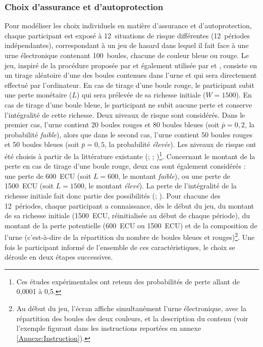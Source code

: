 \begin{Article}
\begin{refsection}[Mouminoux]
\subsubsection{Choix d'assurance et d'autoprotection}

Pour modéliser les choix individuels en matière d'assurance et d'autoprotection, chaque participant est exposé à 12~situations de risque différentes (12~périodes indépendantes), correspondant à un jeu de hasard dans lequel il fait face à une urne électronique contenant 100~boules, chacune de couleur bleue ou rouge. Le jeu, inspiré de la procédure proposée par \textcite{sflcc77} et également utilisée par \textcite{lms09} et \textcite{bct15}, consiste en un tirage aléatoire d'une des boules contenues dans l'urne et qui sera directement effectué par l'ordinateur. En cas de tirage d'une boule rouge, le participant subit une perte monétaire ($L$) qui sera prélevée de sa richesse initiale ($W = 1500$). En cas de tirage d'une boule bleue, le participant ne subit aucune perte et conserve l'intégralité de cette richesse. Deux niveaux de risque sont considérés. Dans le premier cas, l'urne contient 20 boules rouges et 80 boules bleues (soit $\bar{p}=0,2$, la probabilité \textit{faible}), alors que dans le second cas, l'urne contient 50 boules rouges et 50 boules bleues (soit $\bar{p}=0,5$, la probabilité \textit{élevée}). Les niveaux de risque ont été choisis à partir de la littérature existante (\textcite{sflcc77}; \textcite{lms09}; \textcite{bct15})\footnote{Ces études expérimentales ont retenu des probabilités de perte allant de 0,0001 à 0,5.}. Concernant le montant de la perte en cas de tirage d'une boule rouge, deux cas sont également considérés : une perte de 600~ECU (soit $L=600$, le montant \textit{faible}), ou une perte de 1500~ECU (soit $L=1500$, le montant \textit{élevé}). La perte de l'intégralité de la richesse initiale fait donc partie des possibilités (\textcite{lms09}; \textcite{bct15}). Pour chacune des 12~périodes, chaque participant a connaissance, dès le début du jeu, du montant de sa richesse initiale (1500~ECU, réinitialisée au début de chaque période), du montant de la perte potentielle (600~ECU ou 1500~ECU) et de la composition de l'urne (c'est-à-dire de la répartition du nombre de boules bleues et rouges)\footnote{Au début du jeu, l'écran affiche simultanément l'urne électronique, avec la répartition des boules des deux couleurs, et la description du contenu (voir l'exemple figurant dans les instructions reportées en annexe \ref{Annexe:Instruction}).}. Une fois le participant informé de l'ensemble de ces caractéristiques, le choix se déroule en deux étapes successives.


\end{refsection}
\end{Article}
